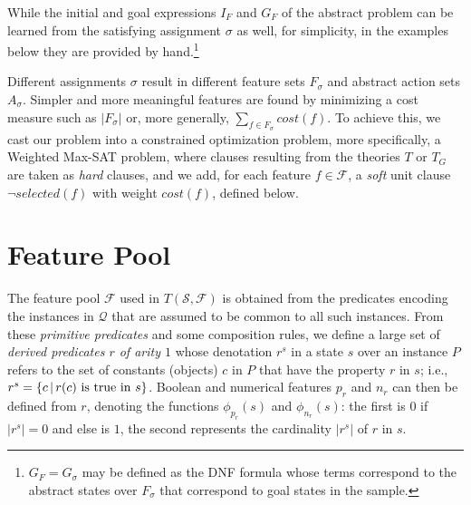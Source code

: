 \documentclass[letterpaper]{article} %
\newcommand{\Omit}[1]{}
\newtheorem{theorem}[definition]{Theorem}
\newcommand{\Q}{\mathcal{Q}}
\newcommand{\F}{\mathcal{F}}
\renewcommand{\S}{\mathcal{S}}
\begin{document}
While the initial and goal expressions $I_F$ and $G_F$ of the abstract problem can be learned
from the satisfying assignment $\sigma$ as well, for simplicity, in the examples below they are
provided by hand.\footnote{$G_F = G_{\sigma}$ may be defined as the DNF formula whose terms
  correspond to the abstract states over $F_{\sigma}$ that correspond to goal states in
  the sample.
  }



\Omit{
Due to  \eqref{eq:d1} and \eqref{eq:goal} that force the selected features in $F_{\sigma}$
to   distinguish goal  from non-goal states, we have that:

\begin{theorem}
For a satisfying assignment $\sigma$  of $T(\S,\F)$,
$s$ is expanded goal   state in $\S$  iff  $s$ satisfies  $G_F=G_{\sigma}$.
\end{theorem}
}
%

Different assignments $\sigma$ result in different feature sets $F_{\sigma}$
and abstract action sets $A_{\sigma}$. Simpler and more meaningful features are found
by minimizing a cost measure such as $|F_{\sigma}|$
or, more generally, $\sum_{f \in F_{\sigma}} cost(f)$.
To achieve this, we cast our problem
into a constrained optimization problem, more specifically, a Weighted Max-SAT problem,
where clauses resulting from the theories $T$ or $T_G$ are taken as \emph{hard} clauses,
and we add, for each feature $f \in \F$, a
\emph{soft} unit clause $\neg selected(f)$ with weight $cost(f)$, defined below.


\section{Feature Pool}

The feature pool $\F$ used in $T(\S,\F)$ is obtained
from the   predicates encoding  the instances in $\Q$
that are assumed to be common to all such instances.
From these \emph{primitive predicates} and some composition rules,
we define a large set of \emph{derived predicates $r$ of arity $1$}
whose denotation $r^s$ in a state $s$ over an instance $P$
refers to the set of constants (objects) $c$ in $P$ that
have the property $r$ in $s$; i.e., $r^s=\{c \, | \, r(c) \hbox{ is true in $s$}\}$.
Boolean and numerical features $p_r$ and $n_r$ can then be defined from  $r$,
denoting the functions $\phi_{p_r}(s)$ and $\phi_{n_r}(s)$: the first is $0$
if $|r^s|=0$ and else is $1$, the second represents the cardinality $|r^s|$ of $r$ in $s$.
\end{document}
